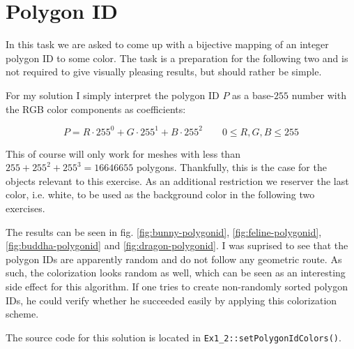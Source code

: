 \documentclass[a4paper,10pt,notitlepage]{scrreprt}
\begin{document}
\pagebreak

\section{Polygon ID}

In this task we are asked to come up with a bijective mapping of an integer
polygon ID to some color. The task is a preparation for the following two and
is not required to give visually pleasing results, but should rather be simple.

For my solution I simply interpret the polygon ID $P$ as a base-$255$ number
with the RGB color components as coefficients:

\begin{equation}
 P = R \cdot 255^0 + G \cdot 255^1 + B \cdot 255^2 \qquad 0 \leq R,G,B \leq
255
\end{equation}

This of course will only work for meshes with less than
$255+255^2+255^3=16646655$ polygons. Thankfully, this is the case for the
objects relevant to this exercise. As an additional restriction we reserver the
last color, i.e. white, to be used as the background color in the following two
exercises.

The results can be seen in fig. \ref{fig:bunny-polygonid},
\ref{fig:feline-polygonid}, \ref{fig:buddha-polygonid} and
\ref{fig:dragon-polygonid}. I was
suprised to see that the polygon IDs are apparently random and do not follow
any geometric route. As such, the colorization looks random as well, which can
be seen as an interesting side effect for this algorithm. If one tries to
create non-randomly sorted polygon IDs, he could verify whether he succeeded
easily by applying this colorization scheme.

The source code for this solution is located in
\texttt{Ex1\_2::setPolygonIdColors()}.
\end{document}
